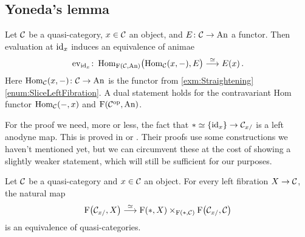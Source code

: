 \subsection{Yoneda's lemma}\label{subsec:Yoneda}
\begin{thm}\label{thm:Yoneda}
	Let $\mathcal{C}$ be a quasi-category, $x\in \mathcal{C}$ an object, and $E\colon \mathcal{C}\rightarrow \mathrm{An}$ a functor. Then evaluation at $\operatorname{id}_x$ induces an equivalence of animae
	\begin{equation*}
		\operatorname{ev}_{\operatorname{id}_x}\colon \operatorname{Hom}_{\operatorname{F}(\mathcal{C},\mathrm{An})}\bigl(\operatorname{Hom}_{\mathcal{C}}(x,-),E\bigr)\overset{\simeq}{\longrightarrow} E(x)\,.
	\end{equation*}
	Here $\operatorname{Hom}_{\mathcal{C}}(x,-)\colon \mathcal{C}\rightarrow \mathrm{An}$ is the functor from \cref{exm:Straightening}\cref{enum:SliceLeftFibration}. A dual statement holds for the contravariant Hom functor $\operatorname{Hom}_{\mathcal{C}}(-,x)$ and $\operatorname{F}(\mathcal{C}^{\mathrm{op}},\mathrm{An})$.
\end{thm}
For the proof we need, more or less, the fact that $*\simeq \{\operatorname{id}_x\}\rightarrow \mathcal{C}_{x/}$ is a left anodyne map. This is proved in \cite[Lemma~4.1.4]{Land} or \cite[Corollary~D.7]{HigherCatsII}. Their proofs use some constructions we haven't mentioned yet, but we can circumvent these at the cost of showing a slightly weaker statement, which will still be sufficient for our purposes.
\begin{lem}\label{lem:WeaklyLeftAnodyne}
	Let $\mathcal{C}$ be a quasi-category and $x\in\mathcal{C}$ an object. For every left fibration $X\rightarrow \mathcal{C}$, the natural map
	\begin{equation*}
		\operatorname{F}\bigl(\mathcal{C}_{x/},X\bigr)\overset{\simeq}{\longrightarrow}\operatorname{F}(*,X)\times_{\operatorname{F}(*,\mathcal{C})}\operatorname{F}\bigl(\mathcal{C}_{x/},\mathcal{C}\bigr)
	\end{equation*}
	is an equivalence of quasi-categories.
\end{lem}
